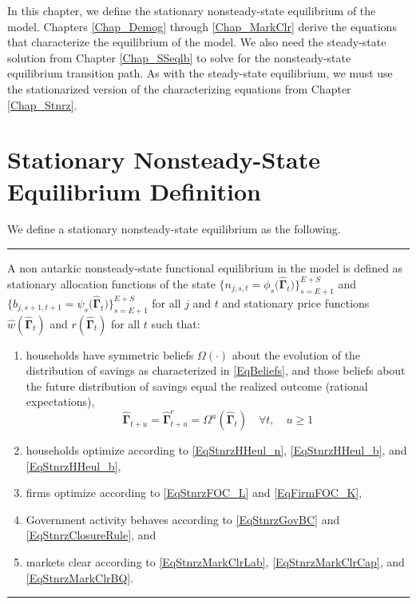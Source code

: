 
In this chapter, we define the stationary nonsteady-state equilibrium of the \ogindia model. Chapters \ref{Chap_Demog} through \ref{Chap_MarkClr} derive the equations that characterize the equilibrium of the model. We also need the steady-state solution from Chapter \ref{Chap_SSeqlb} to solve for the nonsteady-state equilibrium transition path. As with the steady-state equilibrium, we must use the stationarized version of the characterizing equations from Chapter \ref{Chap_Stnrz}.


\section{Stationary Nonsteady-State Equilibrium Definition}\label{SecEqlbNSSdef}

  We define a stationary nonsteady-state equilibrium as the following.

  \vspace{5mm}
  \hrule
  \vspace{-1mm}
  \begin{definition}\label{DefNSSEql}
    A non autarkic nonsteady-state functional equilibrium in the \ogindia model is defined as stationary allocation functions of the state $\bigl\{n_{j,s,t} = \phi_s\bigl(\bm{\hat{\Gamma}}_t\bigr)\bigr\}_{s=E+1}^{E+S}$ and $\bigl\{\hat{b}_{j,s+1,t+1}=\psi_{s}\bigl(\bm{\hat{\Gamma}}_t\bigr)\bigr\}_{s=E+1}^{E+S}$ for all $j$ and $t$ and stationary price functions $\hat{w}(\bm{\hat{\Gamma}}_t)$ and $r(\bm{\hat{\Gamma}}_t)$ for all $t$ such that:
    \begin{enumerate}
      \item households have symmetric beliefs $\Omega(\cdot)$ about the evolution of the distribution of savings as characterized in \eqref{EqBeliefs}, and those beliefs about the future distribution of savings equal the realized outcome (rational expectations),
      \begin{equation*}
        \bm{\hat{\Gamma}}_{t+u} = \bm{\hat{\Gamma}}^e_{t+u} = \Omega^u\left(\bm{\hat{\Gamma}}_t\right) \quad\forall t,\quad u\geq 1
      \end{equation*}
      \item households optimize according to \eqref{EqStnrzHHeul_n}, \eqref{EqStnrzHHeul_b}, and \eqref{EqStnrzHHeul_b},
      \item firms optimize according to \eqref{EqStnrzFOC_L} and \eqref{EqFirmFOC_K},
      \item Government activity behaves according to \eqref{EqStnrzGovBC} and \eqref{EqStnrzClosureRule}, and
      \item markets clear according to \eqref{EqStnrzMarkClrLab}, \eqref{EqStnrzMarkClrCap}, and \eqref{EqStnrzMarkClrBQ}.
    \end{enumerate}
  \end{definition}
  \vspace{-2mm}
  \hrule
  \vspace{5mm}


